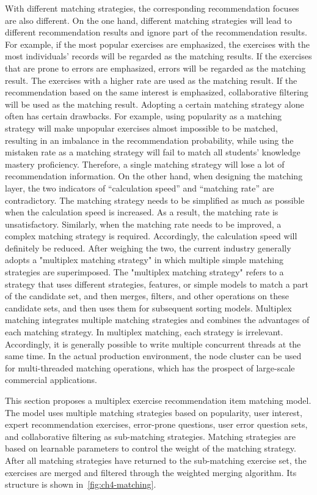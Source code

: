 With different matching strategies, the corresponding recommendation focuses are also different. On the one hand, different matching strategies will lead to different recommendation results and ignore part of the recommendation results. For example, if the most popular exercises are emphasized, the exercises with the most individuals' records will be regarded as the matching results. If the exercises that are prone to errors are emphasized, errors will be regarded as the matching result. The exercises with a higher rate are used as the matching result. If the recommendation based on the same interest is emphasized, collaborative filtering will be used as the matching result. Adopting a certain matching strategy alone often has certain drawbacks. For example, using popularity as a matching strategy will make unpopular exercises almost impossible to be matched, resulting in an imbalance in the recommendation probability, while using the mistaken rate as a matching strategy will fail to match all students' knowledge mastery proficiency. Therefore, a single matching strategy will lose a lot of recommendation information. On the other hand, when designing the matching layer, the two indicators of ``calculation speed'' and ``matching rate'' are contradictory. The matching strategy needs to be simplified as much as possible when the calculation speed is increased. As a result, the matching rate is unsatisfactory. Similarly, when the matching rate needs to be improved, a complex matching strategy is required. Accordingly, the calculation speed will definitely be reduced. After weighing the two, the current industry generally adopts a "multiplex matching strategy" in which multiple simple matching strategies are superimposed. The "multiplex matching strategy" refers to a strategy that uses different strategies, features, or simple models to match a part of the candidate set, and then merges, filters, and other operations on these candidate sets, and then uses them for subsequent sorting models. Multiplex matching integrates multiple matching strategies and combines the advantages of each matching strategy. In multiplex matching, each strategy is irrelevant. Accordingly, it is generally possible to write multiple concurrent threads at the same time. In the actual production environment, the node cluster can be used for multi-threaded matching operations, which has the prospect of large-scale commercial applications.

This section proposes a multiplex exercise recommendation item matching model. The model uses multiple matching strategies based on popularity, user interest, expert recommendation exercises, error-prone questions, user error question sets, and collaborative filtering as sub-matching strategies. Matching strategies are based on learnable parameters to control the weight of the matching strategy. After all matching strategies have returned to the sub-matching exercise set, the exercises are merged and filtered through the weighted merging algorithm. Its structure is shown in~\figurename{\ref{fig:ch4-matching}}.

